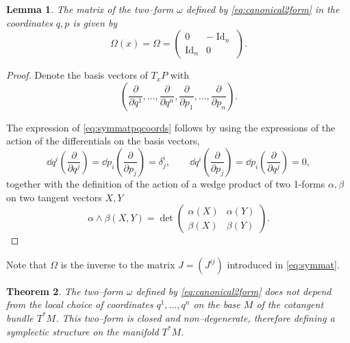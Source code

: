 \documentclass[english,fontsize=11pt,paper=b5]{scrbook}
\numberwithin{equation}{chapter}
\DeclareMathOperator{\Id}{Id}
\DeclareMathOperator{\Id}{Id}
\newtheorem{theorem}{Theorem}[chapter]
\newtheorem{lemma}[theorem]{Lemma}
\theoremstyle{definition}
\begin{document}
    \begin{lemma}
      The matrix of the two--form $\omega$ defined by \eqref{eq:canonical2form} in the coordinates $q,p$ is given by
      \begin{equation}\label{eq:symmatpqcoords}
        \Omega(x) = \Omega = \begin{pmatrix}
          0     & -\Id_n \\
          \Id_n & 0
        \end{pmatrix}.
      \end{equation}
    \end{lemma}
    \begin{proof}
      Denote the basis vectors of $T_x P$ with
      \begin{equation}
        \left(
          \frac{\partial}{\partial q^1}, \ldots, \frac{\partial}{\partial q^n},
          \frac{\partial}{\partial p_1}, \ldots, \frac{\partial}{\partial p_n}
        \right).
      \end{equation}

      The expression of \eqref{eq:symmatpqcoords} follows by using the expressions of the action of the differentials on the basis vectors,
      \begin{equation}
        \dd q^i\left(\frac{\partial}{\partial q^j}\right) = \dd p_i\left(\frac{\partial}{\partial p_j}\right) =\delta^i_j, \qquad
        \dd q^i\left(\frac{\partial}{\partial p_j}\right) =
        \dd p_i\left(\frac{\partial}{\partial q^j}\right) = 0,
      \end{equation}
      together with the definition of the action of a wedge product of two 1-forms $\alpha, \beta$ on two tangent vectors $X, Y$
      \begin{equation}
        \alpha \wedge \beta (X, Y) = \det\begin{pmatrix}
          \alpha(X) & \alpha(Y) \\
          \beta(X)  & \beta(Y)
        \end{pmatrix}.
      \end{equation}
    \end{proof}

    Note that $\Omega$ is the inverse to the matrix $J = (J^{ij})$ introduced in \eqref{eq:symmat}.

    \begin{theorem}\label{thm:propc2f}
      The two--form $\omega$ defined by \eqref{eq:canonical2form} does not depend from the local choice of coordinates $q^1, \ldots, q^n$ on the base $M$ of the cotangent bundle $T^* M$. This two--form is closed and non--degenerate, therefore defining a symplectic structure on the manifold $T^*M$.
    \end{theorem}
\end{document}
